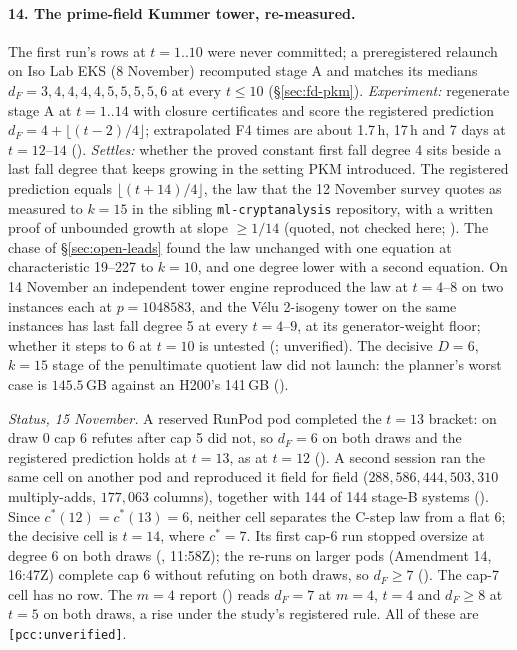 \paragraph{14. The prime-field Kummer tower, re-measured.} The first
run's rows at $t=1..10$ were never committed; a preregistered relaunch on
Iso Lab EKS (8 November) recomputed stage A and matches its medians
$d_F=3,4,4,4,4,5,5,5,5,6$ at every $t\le10$ (\S\ref{sec:fd-pkm}).
\emph{Experiment:} regenerate stage A at $t=1..14$ with closure
certificates and score the registered prediction
$d_F=4+\lfloor(t-2)/4\rfloor$; extrapolated F4 times are about 1.7\,h, 17\,h
and 7 days at $t=12$--$14$ ().
\emph{Settles:} whether the proved constant first fall degree 4 sits beside
a last fall degree that keeps growing in the setting PKM introduced.
The registered prediction equals $\lfloor(t+14)/4\rfloor$, the law that
the 12 November survey quotes as measured to $k=15$ in the sibling
\texttt{ml-cryptanalysis} repository, with a written proof of unbounded
growth at slope $\ge1/14$ (quoted, not checked here;
). The chase of
\S\ref{sec:open-leads} found the law unchanged with one equation at
characteristic 19--227 to $k=10$, and one degree lower with a second
equation. On 14 November an independent tower engine reproduced the law at
$t=4$--$8$ on two instances each at $p=1048583$, and the Vélu 2-isogeny
tower on the same instances has last fall degree 5 at every $t=4$--$9$, at
its generator-weight floor; whether it steps to 6 at $t=10$ is untested
(;
unverified). The decisive $D=6$, $k=15$ stage of the penultimate quotient
law did not launch: the planner's worst case is $145.5$\,GB against an
H200's 141\,GB
().

\emph{Status, 15 November.} A reserved RunPod pod completed the $t=13$
bracket: on draw 0 cap 6 refutes after cap 5 did not, so $d_F=6$ on both
draws and the registered prediction holds at $t=13$, as at $t=12$
().
A second session ran the same cell on another pod and reproduced it field
for field ($288{,}586{,}444{,}503{,}310$ multiply-adds, $177{,}063$
columns), together with 144 of 144 stage-B systems
().
Since $c^*(12)=c^*(13)=6$, neither cell separates the C-step law from a
flat 6; the decisive cell is $t=14$, where $c^*=7$. Its first cap-6 run stopped oversize at degree 6 on both draws
(, 11:58Z);
the re-runs on larger pods (Amendment 14, 16:47Z) complete cap 6 without
refuting on both draws, so $d_F\ge7$
().
The cap-7 cell has no row. The $m=4$ report
()
reads $d_F=7$ at $m=4$, $t=4$
and $d_F\ge8$ at $t=5$ on both draws, a rise under the study's registered
rule. All of these are \texttt{[pcc:unverified]}.

